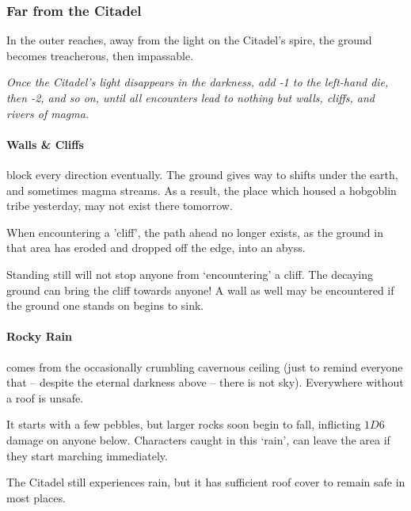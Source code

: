 \begin{multicols}{2}
\subsubsection{Far from the Citadel}

In the outer reaches, away from the light on the Citadel's spire, the ground becomes treacherous, then impassable.

\textit{Once the Citadel's light disappears in the darkness, add -1 to the left-hand die, then -2, and so on, until all encounters lead to nothing but walls, cliffs, and rivers of magma.}

\paragraph{Walls \& Cliffs}
block every direction eventually.
The ground gives way to shifts under the earth, and sometimes magma streams.
As a result, the place which housed a hobgoblin tribe yesterday, may not exist there tomorrow.

When encountering a 'cliff', the path ahead no longer exists, as the ground in that area has eroded and dropped off the edge, into an abyss.

Standing still will not stop anyone from `encountering' a cliff.
The decaying ground can bring the cliff towards anyone!
A wall as well may be encountered if the ground one stands on begins to sink.



\paragraph{Rocky Rain}
comes from the occasionally crumbling cavernous ceiling (just to remind everyone that -- despite the eternal darkness above -- there is not sky).
Everywhere without a roof is unsafe.

It starts with a few pebbles, but larger rocks soon begin to fall, inflicting $1D6$ damage on anyone below.
Characters caught in this `rain', can leave the area if they start marching immediately.

The Citadel still experiences rain, but it has sufficient roof cover to remain safe in most places.


\end{multicols}
